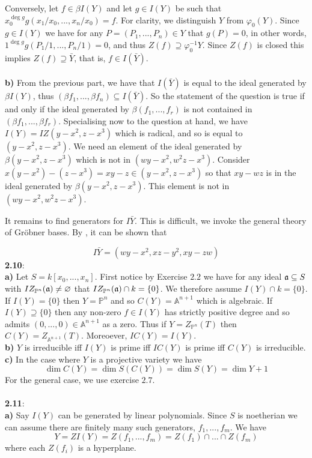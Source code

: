 \documentclass[12pt]{article}
\numberwithin{thm}{subsection}
\numberwithin{defn}{subsection}
\numberwithin{lemma}{subsection}
\numberwithin{example}{subsection}
\numberwithin{notation}{subsection}
\numberwithin{cor}{subsection}
\numberwithin{remark}{subsection}
\numberwithin{condition}{subsection}
\numberwithin{question}{subsection}
\numberwithin{construction}{subsection}
\numberwithin{construction}{subsection}
\numberwithin{construction}{subsection}
\newcommand{\bb}[1]{\mathbb{#1}}
\begin{document}
Conversely, let $f \in \beta I(Y)$ and let $g \in I(Y)$ be such that $x_0^{\operatorname{deg}g}g(x_1/x_0,...,x_n/x_0) = f$. For clarity, we distinguish $Y$ from $\varphi_0(Y)$. Since $g \in I(Y)$ we have for any $P = (P_1,...,P_n) \in Y$ that $g(P) = 0$, in other words, $1^{\operatorname{deg}g}g(P_1/1,...,P_n/1) = 0$, and thus $Z(f) \supseteq \varphi_0^{-1}Y$. Since $Z(f)$ is closed this implies $Z(f) \supseteq \bar{Y}$, that is, $f \in I(\bar{Y})$.\\\\
%
\textbf{b)} From the previous part, we have that $I(\bar{Y})$ is equal to the ideal generated by $\beta I(Y)$, thus $(\beta f_1,...,\beta f_n) \subseteq I(\bar{Y})$. So the statement of the question is true if and only if the ideal generated by $\beta (f_1,...,f_r)$ is not contained in $(\beta f_1,..., \beta f_r)$. Specialising now to the question at hand, we have $I(Y) = IZ(y - x^2, z - x^3)$ which is radical, and so is equal to $(y-x^2, z-x^3)$. We need an element of the ideal generated by $\beta (y - x^2, z - x^3)$ which is not in $(wy - x^2, w^2z - x^3)$. Consider $x(y - x^2) - (z - x^3) = xy - z \in (y - x^2, z - x^3)$ so that $xy - wz$ is in the ideal generated by $\beta (y - x^2, z-x^3)$. This element is not in $(wy - x^2, w^2z - x^3)$.

It remains to find generators for $I\bar{Y}$. This is difficult, we invoke the general theory of Gr\"{o}bner bases. By \cite[Lemma 3.2.17]{varieties}, it can be shown that

\begin{equation}
I\bar{Y} = (wy - x^2, xz - y^2, xy - zw)
\end{equation}
%
\textbf{2.10}:\\
\textbf{a)} Let $S = k[x_0,...,x_n]$. First notice by Exercise $2.2$ we have for any ideal $\frak{a} \subseteq S$ with $IZ_{\bb{P}^n}(\frak{a}) \neq \varnothing$ that $IZ_{\bb{P}^n}(\frak{a}) \cap k = \lbrace 0 \rbrace $. We therefore assume $I(Y) \cap k = \lbrace 0 \rbrace$. If $I(Y) = \lbrace 0\rbrace$ then $Y = \bb{P}^n$ and so $C(Y) = \bb{A}^{n+1}$ which is algebraic. If $I(Y) \supseteq \lbrace 0 \rbrace$ then any non-zero $f \in I(Y)$ has strictly positive degree and so admits $(0,...,0) \in \bb{A}^{n+1}$ as a zero. Thus if $Y = Z_{\bb{P}^n}(T)$ then $C(Y) = Z_{\bb{A}^{n+1}}(T)$. Moreoever, $IC(Y) = I(Y)$.\\
\textbf{b)} $Y$ is irreducible iff $I(Y)$ is prime iff $IC(Y)$ is prime iff $C(Y)$ is irreducible.\\
\textbf{c)} In the case where $Y$ is a projective variety we have
\[\operatorname{dim}C(Y) = \operatorname{dim}S(C(Y)) = \operatorname{dim}S(Y) = \operatorname{dim}Y + 1\]
For the general case, we use exercise $2.7$.\\\\
%
\textbf{2.11}:\\
\textbf{a)} Say $I(Y)$ can be generated by linear polynomials. Since $S$ is noetherian we can assume there are finitely many such generators, $f_1,...,f_m$. We have
\[Y = ZI(Y) = Z(f_1,...,f_m) = Z(f_1) \cap ... \cap Z(f_m)\]
where each $Z(f_i)$ is a hyperplane.\\
\end{document}
